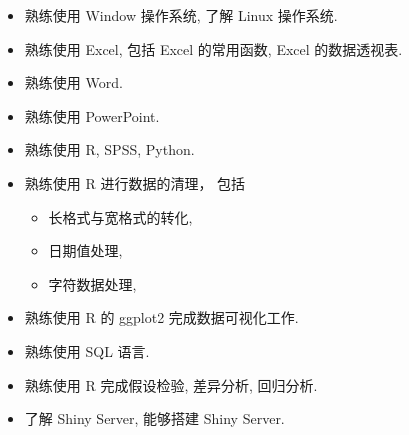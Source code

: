 \begin{itemize}
\item 熟练使用 Window 操作系统, 了解 Linux 操作系统.
\item 熟练使用 Excel, 包括 Excel 的常用函数, Excel 的数据透视表.
\item 熟练使用 Word.
\item 熟练使用 PowerPoint.
\item 熟练使用 R, SPSS, Python.
\item 熟练使用 R 进行数据的清理， 包括
\begin{itemize}
\item 长格式与宽格式的转化,
\item 日期值处理,
\item 字符数据处理,
\end{itemize}
\item 熟练使用 R 的 ggplot2 完成数据可视化工作.
\item 熟练使用 SQL 语言.
\item 熟练使用 R 完成假设检验, 差异分析, 回归分析.
\item 了解 Shiny Server, 能够搭建 Shiny Server.
\end{itemize}
